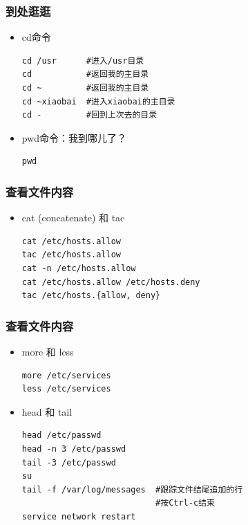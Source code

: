 \documentclass[xcolor=svgnames,presentation]{beamer}
\begin{document}
\begin{frame}[fragile]
\frametitle{到处逛逛}
\label{sec-4-2-11}
\begin{itemize}

\item cd命令\\
\label{sec-4-2-11-1}%
\begin{verbatim}
cd /usr      #进入/usr目录
cd           #返回我的主目录
cd ~         #返回我的主目录
cd ~xiaobai  #进入xiaobai的主目录
cd -         #回到上次去的目录
\end{verbatim}

\item pwd命令：我到哪儿了？\\
\label{sec-4-2-11-2}%
\begin{verbatim}
pwd
\end{verbatim}
\end{itemize} %
\end{frame}
\begin{frame}[fragile]
\frametitle{查看文件内容}
\label{sec-4-2-12}
\begin{itemize}

\item cat (concatenate) 和 tac\\
\label{sec-4-2-12-1}%
\begin{verbatim}
cat /etc/hosts.allow
tac /etc/hosts.allow
cat -n /etc/hosts.allow
cat /etc/hosts.allow /etc/hosts.deny
tac /etc/hosts.{allow, deny}
\end{verbatim}
\end{itemize} %
\end{frame}
\begin{frame}[fragile]
\frametitle{查看文件内容}
\label{sec-4-2-13}
\begin{itemize}

\item more 和 less\\
\label{sec-4-2-13-1}%
\begin{verbatim}
more /etc/services
less /etc/services
\end{verbatim}

\item head 和 tail\\
\label{sec-4-2-13-2}%
\begin{verbatim}
head /etc/passwd
head -n 3 /etc/passwd
tail -3 /etc/passwd
su
tail -f /var/log/messages  #跟踪文件结尾追加的行
                           #按Ctrl-c结束
service network restart
\end{verbatim}
\end{itemize} %
\end{frame}
\end{document}

